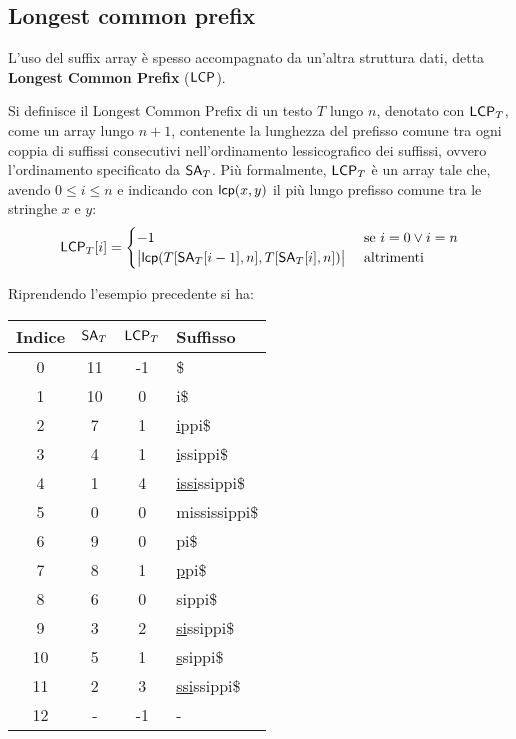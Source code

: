 \subsection{Longest common prefix}
L'uso del suffix array è spesso accompagnato da un'altra struttura
dati, detta \textbf{Longest Common Prefix} ($\mbox{\rm {\sf LCP}}$).
\begin{definizione}
  Si definisce il Longest Common Prefix di un testo $T$
  lungo $n$,
  denotato con $\mbox{\rm {\sf LCP}}_T$, come un array lungo $n+1$, contenente la
  lunghezza del prefisso comune tra ogni coppia di suffissi consecutivi
  nell'ordinamento lessicografico dei suffissi, ovvero l'ordinamento specificato
  da $\mbox{\rm {\sf SA}}_T$. Più formalmente,
  $\mbox{\rm {\sf LCP}}_T$ è un array tale che, avendo $0\leq i\leq n$ e indicando con
  $\mbox{\rm {\sf lcp}}(x,y)$ il più lungo prefisso comune tra le stringhe $x$ e $y$:
  \begin{equation}
    \label{eq:lcpdef}
    \mbox{\rm {\sf LCP}}_T[i]=
    \begin{cases}
      -1&\mbox{ se } i=0 \lor i=n\\
      \big\lvert\mbox{\rm {\sf lcp}}(T[\mbox{\rm {\sf SA}}_T[i-1], n],T[\mbox{\rm {\sf SA}}_T [i], n])\big\rvert&\mbox{
        altrimenti} 
    \end{cases}
  \end{equation}
\end{definizione}
\begin{esempio}
  Riprendendo l'esempio precedente si ha:
  \begin{table}[H]
    \centering
    \footnotesize
    \begin{tabular}{c|c|c|l} 
      \textbf{Indice} & $\mbox{\rm {\sf SA}}_T$ & $\mbox{\rm {\sf LCP}}_T$ & \textbf{Suffisso}\\ 
      \hline
      0 & 11 & -1 & \$\\
      1 & 10 & 0 & i\$\\
      2 & 7 & 1 & \underline{i}ppi\$\\
      3 & 4 & 1 & \underline{i}ssippi\$\\
      4 & 1 & 4 & \underline{issi}ssippi\$\\
      5 & 0 & 0 & mississippi\$\\
      6 & 9 & 0 & pi\$\\
      7 & 8 & 1 & \underline{p}pi\$\\
      8 & 6 & 0 & sippi\$\\
      9 & 3 & 2 & \underline{si}ssippi\$\\
      10 & 5 & 1 & \underline{s}sippi\$\\
      11 & 2 & 3 & \underline{ssi}ssippi\$\\
      12 & - & -1 & -
    \end{tabular}
  \end{table}
\end{esempio}
